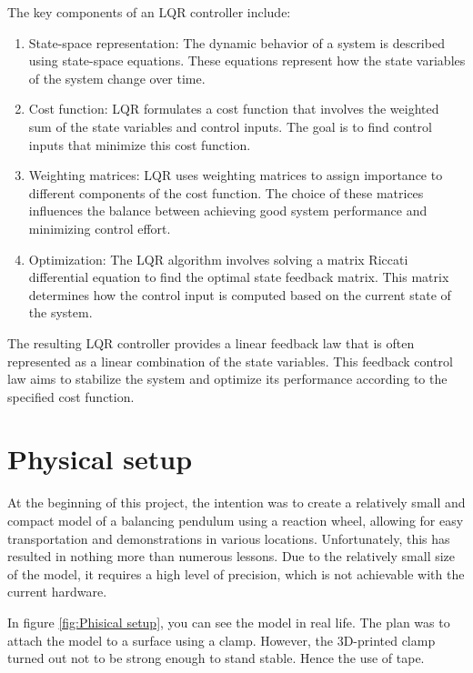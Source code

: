 \documentclass{article}
\begin{document}
\begin{multicols}{2}
The key components of an LQR controller include:
\begin{enumerate}
    \item State-space representation: The dynamic behavior of a system is described using state-space equations. These equations represent how the state variables of the system change over time.
    \item Cost function: LQR formulates a cost function that involves the weighted sum of the state variables and control inputs. The goal is to find control inputs that minimize this cost function.
    \item Weighting matrices: LQR uses weighting matrices to assign importance to different components of the cost function. The choice of these matrices influences the balance between achieving good system performance and minimizing control effort.
    \item Optimization: The LQR algorithm involves solving a matrix Riccati differential equation to find the optimal state feedback matrix. This matrix determines how the control input is computed based on the current state of the system.
\end{enumerate}

The resulting LQR controller provides a linear feedback law that is often represented as a linear combination of the state variables. This feedback control law aims to stabilize the system and optimize its performance according to the specified cost function.

\section{Physical setup}
At the beginning of this project, the intention was to create a relatively small and compact model of a balancing pendulum using a reaction wheel, allowing for easy transportation and demonstrations in various locations. Unfortunately, this has resulted in nothing more than numerous lessons. Due to the relatively small size of the model, it requires a high level of precision, which is not achievable with the current hardware.

In figure \ref{fig:Phisical setup}, you can see the model in real life. The plan was to attach the model to a surface using a clamp. However, the 3D-printed clamp turned out not to be strong enough to stand stable. Hence the use of tape.


\end{multicols}
\end{document}
